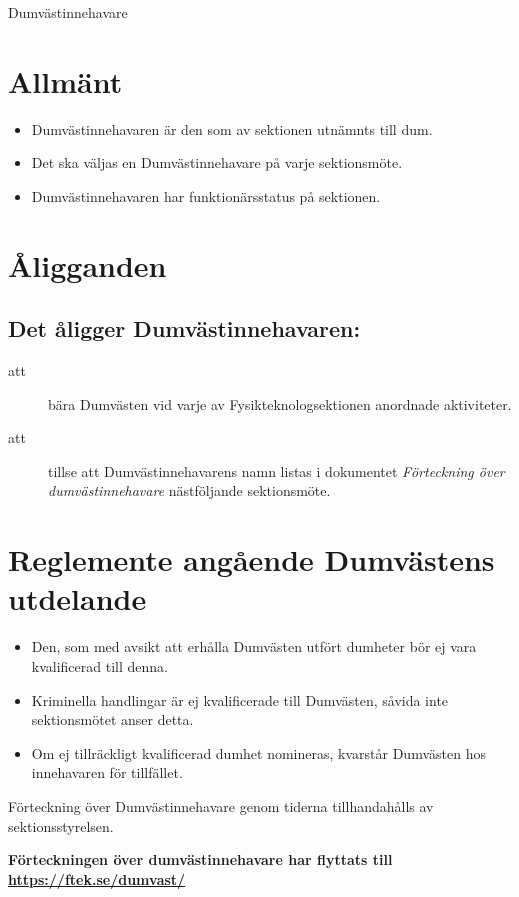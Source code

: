 \documentclass[a4paper]{article}
\begin{document}
\renewcommand{\forening}{Dumvästinnehavare} %

\begin{foreningenv}{\forening{}} %
    \section{Allmänt}
    \begin{itemize}
    \item Dumvästinnehavaren är den som av sektionen utnämnts till dum.
    \item Det ska väljas en Dumvästinnehavare på varje sektionsmöte.
    \item Dumvästinnehavaren har funktionärsstatus på sektionen.
    \end{itemize}
    
    \section{Åligganden}
    \aliggsektfunkt{}
    
    \subsection{Det åligger Dumvästinnehavaren:}
    \begin{description}
      \item[att] bära Dumvästen vid varje av Fysikteknologsektionen anordnade aktiviteter.
      \item[att] tillse att Dumvästinnehavarens namn listas i dokumentet \textit{Förteckning över dumvästinnehavare} nästföljande sektionsmöte.
    \end{description}
    
    \section{Reglemente angående Dumvästens utdelande}
    \begin{itemize}
      \item Den, som med avsikt att erhålla Dumvästen utfört dumheter
      bör ej vara kvalificerad till denna.
      \item Kriminella handlingar är ej kvalificerade till Dumvästen,
      såvida inte sektionsmötet anser detta.
      \item Om ej tillräckligt kvalificerad dumhet nomineras, kvarstår Dumvästen hos innehavaren för tillfället.
    \end{itemize}
    
    Förteckning över Dumvästinnehavare genom tiderna tillhandahålls av sektionsstyrelsen.
    
    \vspace{3em}
    
    \textbf{Förteckningen över dumvästinnehavare har flyttats till \href{https://ftek.se/dumvast/}{https://ftek.se/dumvast/}} %
\end{foreningenv}
\end{document}
